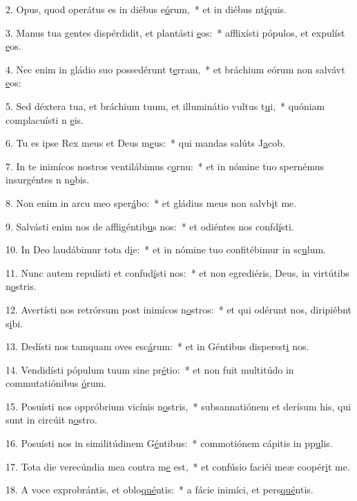 2. Opus, quod operátus es in diébus e\uline{ó}rum,~* et in diébus nt\uline{í}quis.\par 
3. Manus tua gentes dispérdidit, et plantásti \uline{e}os:~* afflixísti pópulos, et expulíst \uline{e}os.\par 
4. Nec enim in gládio suo possedérunt t\uline{e}rram,~* et bráchium eórum non salvávt \uline{e}os:\par 
5. Sed déxtera tua, et bráchium tuum, et illuminátio vultus t\uline{u}i,~* quóniam complacuísti n \uline{e}is.\par 
6. Tu es ipse Rex meus et Deus m\uline{e}us:~* qui mandas salúts J\uline{a}cob.\par 
7. In te inimícos nostros ventilábimus c\uline{o}rnu:~* et in nómine tuo spernémus insurgéntes n n\uline{o}bis.\par 
8. Non enim in arcu meo sper\uline{á}bo:~* et gládius meus non salvb\uline{i}t me.\par 
9. Salvásti enim nos de affligéntib\uline{u}s nos:~* et odiéntes nos confd\uline{í}sti.\par 
10. In Deo laudábimur tota d\uline{i}e:~* et in nómine tuo confitébimur in sc\uline{u}lum.\par 
11. Nunc autem repulísti et confud\uline{í}sti nos:~* et non egrediéris, Deus, in virtútibs n\uline{o}stris.\par 
12. Avertísti nos retrórsum post inimícos n\uline{o}stros:~* et qui odérunt nos, diripiébnt s\uline{i}bi.\par 
13. Dedísti nos tamquam oves esc\uline{á}rum:~* et in Géntibus dispersst\uline{i} nos.\par 
14. Vendidísti pópulum tuum sine pr\uline{é}tio:~* et non fuit multitúdo in commutatiónibus \uline{ó}rum.\par 
15. Posuísti nos oppróbrium vicínis n\uline{o}stris,~* subsannatiónem et derísum his, qui sunt in circúit n\uline{o}stro.\par 
16. Posuísti nos in similitúdinem G\uline{é}ntibus:~* commotiónem cápitis in pp\uline{u}lis.\par 
17. Tota die verecúndia mea contra m\uline{e} est,~* et confúsio faciéi meæ coopér\uline{i}t me.\par 
18. A voce exprobrántis, et oblo\uline{qué}ntis:~* a fácie inimíci, et pers\uline{qué}ntis.\par 
